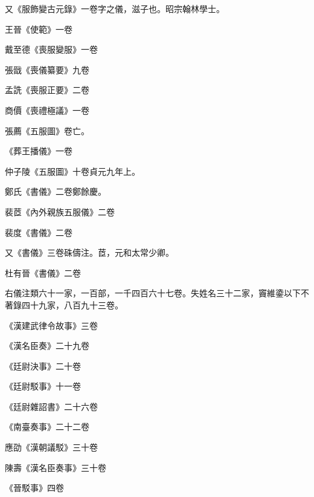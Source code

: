 \begin{pinyinscope}
 又《服飾變古元錄》一卷字之儀，滋子也。昭宗翰林學士。



 王晉《使範》一卷



 戴至德《喪服變服》一卷



 張戩《喪儀纂要》九卷



 孟詵《喪服正要》二卷



 商價《喪禮極議》一卷



 張薦《五服圖》卷亡。



 《葬王播儀》一卷



 仲子陵《五服圖》十卷貞元九年上。



 鄭氏《書儀》二卷鄭餘慶。



 裴茝《內外親族五服儀》二卷



 裴度《書儀》二卷



 又《書儀》三卷硃儔注。茝，元和太常少卿。



 杜有晉《書儀》二卷



 右儀注類六十一家，一百部，一千四百六十七卷。失姓名三十二家，竇維鍌以下不著錄四十九家，八百九十三卷。



 《漢建武律令故事》三卷



 《漢名臣奏》二十九卷



 《廷尉決事》二十卷



 《廷尉駁事》十一卷



 《廷尉雜詔書》二十六卷



 《南臺奏事》二十二卷



 應劭《漢朝議駁》三十卷



 陳壽《漢名臣奏事》三十卷



 《晉駁事》四卷




\end{pinyinscope}
